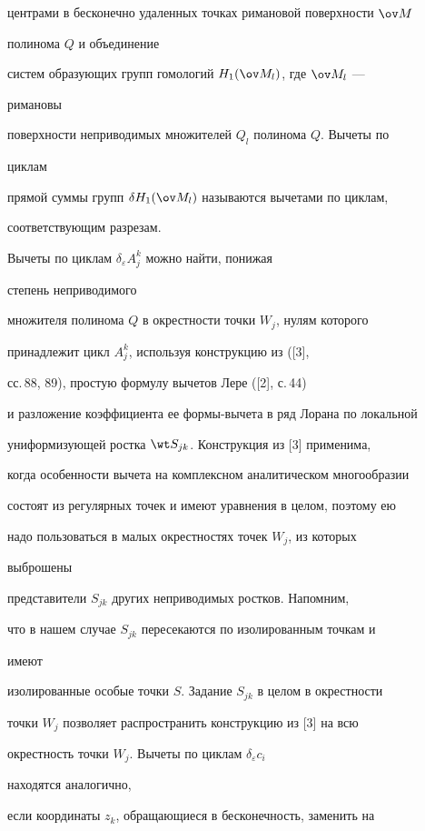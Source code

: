 центрами в бесконечно удаленных точках римановой поверхности $\ov M$ 


полинома $Q$ и объединение  


систем образующих групп гомологий $H_1(\ov M_l)$, где $\ov M_l$ --- 


римановы 


поверхности неприводимых множителей $Q_l$ полинома $Q$. Вычеты по 


циклам 


прямой суммы групп $\delta H_1(\ov M_l)$ называются вычетами по циклам, 


соответствующим разрезам. 


 


Вычеты по циклам $\delta_\varepsilon A^k_j$ можно найти, понижая 


степень неприводимого 


множителя полинома $Q$ в окрестности точки $W_j$, нулям которого 


принадлежит цикл $A^k_j$, используя конструкцию из ([3], 


сс.\,88, 89), простую формулу вычетов Лере ([2], с.\,44)


и разложение коэффициента ее формы-вычета в ряд Лорана по локальной 


униформизующей ростка $\wt S_{jk}$. Конструкция из [3] применима, 


когда особенности вычета на комплексном аналитическом многообразии  


состоят из регулярных точек и имеют уравнения в целом, поэтому ею 


надо пользоваться в малых окрестностях точек $W_j$, из которых 


выброшены 


представители $S_{jk}$ других неприводимых ростков. Напомним, 


что в нашем случае $S_{jk}$ пересекаются по изолированным точкам и 


имеют 


изолированные особые точки $S$. Задание $S_{jk}$ в целом в окрестности 


точки $W_j$ позволяет распространить конструкцию из [3] на всю 


окрестность точки $W_j$. Вычеты по циклам $\delta_\varepsilon c_i$ 


находятся аналогично, 


если координаты $z_k$, обращающиеся в бесконечность, заменить на 


